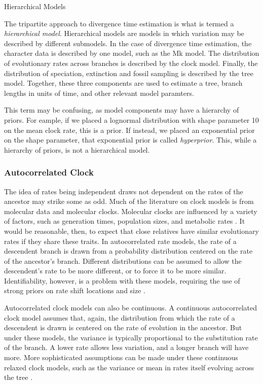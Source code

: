 \documentclass[11pt]{article}
\begin{document}
\begin{boxedtext}{Hierarchical Models}

The tripartite approach to divergence time estimation is what is termed a \textit{hierarchical model}. 
Hierarchical models are models in which variation may be described by different submodels.
In the case of divergence time estimation, the character data is described by one model, such as the Mk model.
The distribution of evolutionary rates across branches is described by the clock model.
Finally, the distribution of speciation, extinction and fossil sampling is described by the tree model.
Together, these three components are used to estimate a tree, branch lengths in units of time, and other relevant model paramters.

This term may be confusing, as model components may have a hierarchy of priors. 
For eample, if we placed a lognormal distribution with shape parameter 10 on the mean clock rate, this is a prior.
If instead, we placed an exponential prior on the shape parameter, that exponential prior is called \textit{hyperprior}.
This, while a hierarchy of priors, is not a hierarchical model. 

\end{boxedtext}
\clearpage

\subsubsection{Autocorrelated Clock}
The idea of rates being independent draws not dependent on the rates of the ancestor may strike some as odd. 
Much of the literature on clock models is from molecular data and molecular clocks.
Molecular clocks are influenced by a variety of factors, such as generation times, population sizes, and metabolic rates \cite{bromham1996, gaut1992}.
It would be reasonable, then, to expect that close relatives have similar evolutionary rates if they share these traits.
In autocorrelated rate models, the rate of a descendent branch is drawn from a probability distribution \cite{Aris-Brosou2002}  centered on the rate of the ancestor's branch. 
Different distributions can be assumed to allow the descendent's rate to be more different, or to force it to be more similar. 
Identifiability, however, is a problem with these models, requiring the use of strong priors on rate shift locations and size \cite{Rannala2002, Ronquist2012a}.

Autocorrelated clock models can also be continuous.
A continuous autocorrelated clock model assumes that, again, the distribution from which the rate of a descendent is drawn is centered on the rate of evolution in the ancestor.
But under these models, the variance is typically proportional to the substitution rate of the branch. 
A lower rate allows less variation, and a longer branch will have more.
More sophisticated assumptions can be made under these continuous relaxed clock models, such as the variance or mean in rates itself evolving across the tree \cite{Thorne1998, Kishino2001, Thorne2002, Aris-Brosou2002, Aris-Brosou2003}.
\end{document}
